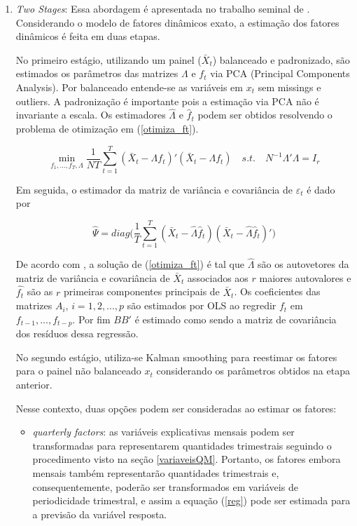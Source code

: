 \documentclass{article}
\begin{document}
\begin{enumerate}
\item \textit{Two Stages}: Essa abordagem é apresentada no trabalho seminal de \cite{giannoneetal2008}. Considerando o modelo de fatores dinâmicos exato, a estimação dos fatores dinâmicos é feita em duas etapas.

No primeiro estágio, utilizando um painel ($\bar{X}_t$) balanceado e padronizado, são estimados os parâmetros das matrizes $\Lambda$ e $f_t$ via PCA (Principal Components Analysis). Por balanceado entende-se as variáveis em $x_t$ sem missings e outliers. A padronização é importante pois a estimação via PCA não é invariante a escala. Os estimadores $\hat\Lambda$ e $\hat{f}_t$ podem ser obtidos resolvendo o problema de otimização em (\ref{otimiza_ft}).

\begin{equation}\label{otimiza_ft}
\min_{f_1,...,f_T,\Lambda} \frac{1}{NT} \sum_{t=1}^T (\bar{X}_t -\Lambda f_t)'(\bar{X}_t -\Lambda f_t) \quad s.t. \quad N^{-1} \Lambda'\Lambda = I_r
\end{equation}

Em seguida, o estimador da matriz de variância e covariância de $\varepsilon_t$ é dado por

\begin{equation}
\hat{\Psi} = diag\Bigg(\frac{1}{T} \sum_{t=1}^T (\bar{X}_t -\hat{\Lambda} \hat{f}_t)(\bar{X}_t -\hat{\Lambda} \hat{f}_t)'\Bigg)
\end{equation}

De acordo com \cite{stockwatson2011}, a solução de (\ref{otimiza_ft}) é tal que $\hat{\Lambda}$ são os autovetores da matriz de variância e covariância de $\bar{X}_t$ associados aos $r$ maiores autovalores e $\hat{f_t}$ são as $r$ primeiras componentes principais de $\bar{X}_t$. Os coeficientes das matrizes $A_i$, $i = 1,2,...,p$ são estimados por OLS ao regredir $f_t$ em $f_{t-1},...,f_{t-p}$. Por fim $BB'$ é estimado como sendo a matriz de covariância dos resíduos dessa regressão.

No segundo estágio, utiliza-se Kalman smoothing para reestimar os fatores para o painel não balanceado $x_t$ considerando os parâmetros obtidos na etapa anterior.

Nesse contexto, duas opções podem ser consideradas ao estimar os fatores:

\begin{itemize}
\item \textit{quarterly factors}: as variáveis explicativas mensais podem ser transformadas para representarem quantidades trimestrais seguindo o procedimento visto na seção \ref{variaveisQM}. Portanto, os fatores embora mensais também representarão quantidades trimestrais e, consequentemente, poderão ser transformados em variáveis de periodicidade trimestral, e assim a equação (\ref{reg}) pode ser estimada para a previsão da variável resposta.


\end{itemize}
\end{enumerate}
\end{document}
